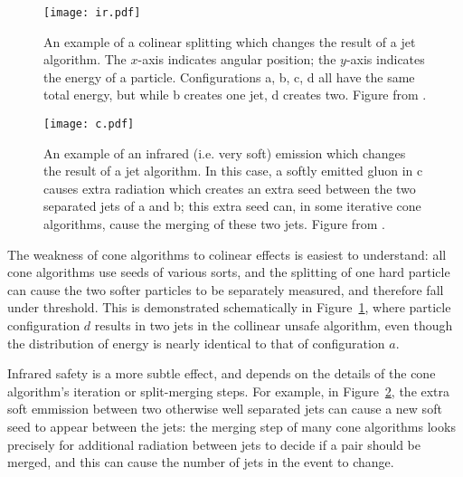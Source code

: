 
\begin{figure}
\centering
\texttt{[image: ir.pdf]}
\caption{An example of a colinear splitting which changes the result of a jet algorithm. The $x$-axis indicates angular position; the $y$-axis indicates the energy of a particle. Configurations a, b, c, d all have the same total energy, but while b creates one jet, d creates two. Figure from \cite{Jetography}.}
\label{fig:jets:ir}
\end{figure}



\begin{figure}
\centering
\texttt{[image: c.pdf]}
\caption{An example of an infrared (i.e. very soft) emission which changes the result of a jet algorithm. In this case, a softly emitted gluon in c causes extra radiation which creates an extra seed between the two separated jets of a and b; this extra seed can, in some iterative cone algorithms, cause the merging of these two jets. Figure from \cite{Jetography}.}
\label{fig:jets:c}
\end{figure}


The weakness of cone algorithms to colinear effects is easiest to understand: all cone algorithms use seeds of various sorts, and the splitting of one hard particle can cause the two softer particles to be separately measured, and therefore fall under threshold. This is demonstrated schematically in Figure~\ref{fig:jets:ir}, where particle configuration $d$ results in two jets in the collinear unsafe algorithm, even though the distribution of energy is nearly identical to that of configuration $a$.

Infrared safety is a more subtle effect, and depends on the details of the cone algorithm's iteration or split-merging steps. For example, in Figure~\ref{fig:jets:c}, the extra soft emmission between two otherwise well separated jets can cause a new soft seed to appear between the jets: the merging step of many cone algorithms looks precisely for additional radiation between jets to decide if a pair should be merged, and this can cause the number of jets in the event to change.

